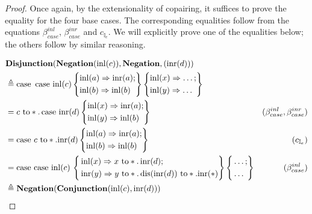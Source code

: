 \begin{proof}

  Once again, by the extensionality of copairing, it suffices to prove the equality for the four base cases. The corresponding equalities follow from the equations 
\(\beta_{case}^{inl}\), \(\beta_{case}^{inr}\) and \(c_{\mathbb{I}_e}\). 
We will explicitly prove one of the equalities below; the others follow by similar reasoning.

\begin{equation*}
  \begin{split}
  & \textbf{Disjunction} (\textbf{Negation} (\mathrm{inl}(c)), \textbf{Negation}, (\mathrm{inr}(d))) \\ 
  & \triangleq \text{case }  \, 
    \text{case } \mathrm{inl}(c)  
    \left\{ \begin{aligned}
    & \mathrm{inl}(a) \Rightarrow \mathrm{inr}(a); \\
    & \mathrm{inl}(b) \Rightarrow \mathrm{inl}(b) 
  \end{aligned}  \right\}  
   \left\{ \begin{aligned}
    & \mathrm{inl}(x) \Rightarrow  \ldots ; \\
    & \mathrm{inl}(y) \Rightarrow  \ldots
   \end{aligned} \right\} \\
   &  =  c \text{ to} *. \, \text{case } \mathrm{inr}(d)  
    \left\{ \begin{aligned}
    & \mathrm{inl}(x) \Rightarrow \mathrm{inr}(a); \\
    & \mathrm{inl}(y) \Rightarrow \mathrm{inl}(b) 
  \end{aligned}  \right\}   & (\beta_{case}^{inl},\beta_{case}^{inr}) \\
  & =  \text{case } c \text{ to} *. \mathrm{inr}(d)  
    \left\{ \begin{aligned}
    & \mathrm{inl}(a) \Rightarrow \mathrm{inr}(a); \\
    & \mathrm{inl}(b) \Rightarrow \mathrm{inl}(b) 
  \end{aligned}  \right\}    & (c_{\mathbb{I}_e})\\
  & = \text{case }  \text{case } \mathrm{inl}(c)\,
  \left\{
    \begin{aligned}
    &\mathrm{inl}(x) \Rightarrow x \text{ to} *. \, \mathrm{inr}(d) ;\\
  \,& \mathrm{inr}(y) \Rightarrow y \text{ to} *. \,  \text{dis}(\mathrm{inr}(d)) \text{ to} *. \mathrm{inr}(*)
  \end{aligned} 
  \right\} \left\{ \begin{aligned}
    &  \ldots; \\
    & \ldots
  \end{aligned}  \right\} & (\beta_{case}^{inl})\\
  & \triangleq \textbf{Negation}(\textbf{Conjunction} (\mathrm{inl}(c), \mathrm{inr}(d))) \\
  \end{split}
\end{equation*}

\end{proof}

